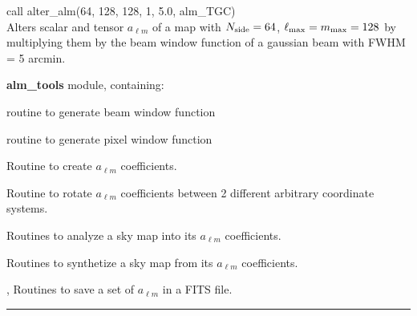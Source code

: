 \begin{example}
{
call alter\_alm(64, 128, 128, 1, 5.0, alm\_TGC)  \\
}
{
Alters scalar and tensor $a_{\ell m}$ of a map with $N_{\mathrm{side}}=64$, 
 $\ell_{\mathrm{max}}=m_{\mathrm{max}} = 128$ by multiplying them by the beam window function of a
gaussian beam with FWHM = 5 arcmin.
}
\end{example}

\begin{modules}
  \begin{sulist}{} %
  \item[\textbf{alm\_tools}] module, containing:
	\item[\htmlref{generate\_beam}{sub:generate_beam}] routine to generate beam window function
	\item[\htmlref{pixel\_window}{sub:pixel_window}] routine to generate pixel window function
  \end{sulist}
\end{modules}

\begin{related}
  \begin{sulist}{} %
  \item[\htmlref{create\_alm}{sub:create_alm}] Routine to create $a_{\ell m}$ coefficients.
  \item[\htmlref{rotate\_alm}{sub:rotate_alm}] Routine to rotate $a_{\ell m}$
  coefficients between 2 different arbitrary coordinate systems.
  \item[\htmlref{map2alm}{sub:map2alm}]  Routines to analyze a \healpix sky map into its $a_{\ell m}$
  coefficients.
  \item[\htmlref{alm2map}{sub:alm2map}] Routines to synthetize a \healpix sky map from its $a_{\ell m}$
  coefficients.
  \item[\htmlref{alms2fits}{sub:alms2fits}, \htmlref{dump\_alms}{sub:dump_alms}]
  Routines to save a set of $a_{\ell m}$ in a FITS file.  
  \end{sulist}
\end{related}

\rule{\hsize}{2mm}

\newpage
